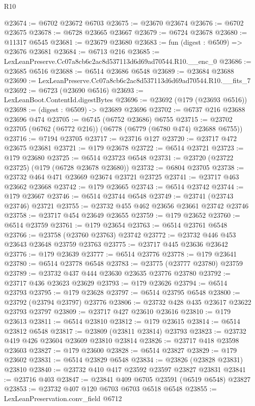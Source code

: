 \begin{lexlean}{R10}
\begin{coremodule}
@23674 := @6702 @23672 @6703
@23675 := @23670 @23674
@23676 := @6702 @23675
@23678 := @6728 @23665 @23667
@23679 := @6724 @23678
@23680 := @11317 @6545
@23681 := @23679 @23680
@23683 := fun (digest : @6509) => @23676 @23681
@23684 := @6713 @216
@23685 := LexLeanPreserve.Cc07a8cb6c2ac8d537113d6d69ad70544.R10.__enc_0
@23686 := @23685 @6516
@23688 := @6514 @23686 @6548
@23689 := @23684 @23688
@23690 := LexLeanPreserve.Cc07a8cb6c2ac8d537113d6d69ad70544.R10.__fits_7
@23692 := @6723 (@23690 @6516)
@23693 := LexLeanBoot.ContentId.digestBytes
@23696 := @23692 (@179 (@23693 @6516))
@23698 := (digest : @6509) -> @23689 @23696
@23702 := @6737 @216 @23688 @23696 @474
@23705 := @6745 (@6752 @23686) @6755
@23715 := @23702 @23705 (@6762 (@6772 @216)) (@6778 (@6779 (@6780 @474) @23688 @6755))
@23716 := @7194 @23705
@23717 := @23716 @127
@23720 := @23717 @472 @23675 @23681
@23721 := @179 @23678
@23722 := @6514 @23721
@23723 := @179 @23680
@23725 := @6514 @23723 @6548
@23731 := @23720 (@23722 @23725) (@179 (@6728 @23678 @23680))
@23732 := @6804 @23705
@23738 := @23732 @464 @471 @23669 @23674 @23721 @23725
@23741 := @23717 @463 @23662 @23668
@23742 := @179 @23665
@23743 := @6514 @23742
@23744 := @179 @23667
@23746 := @6514 @23744 @6548
@23749 := @23741 (@23743 @23746) @23721
@23755 := @23732 @455 @462 @23656 @23661 @23742 @23746
@23758 := @23717 @454 @23649 @23655
@23759 := @179 @23652
@23760 := @6514 @23759
@23761 := @179 @23654
@23763 := @6514 @23761 @6548
@23766 := @23758 (@23760 @23763) @23742
@23772 := @23732 @446 @453 @23643 @23648 @23759 @23763
@23775 := @23717 @445 @23636 @23642
@23776 := @179 @23639
@23777 := @6514 @23776
@23778 := @179 @23641
@23780 := @6514 @23778 @6548
@23783 := @23775 (@23777 @23780) @23759
@23789 := @23732 @437 @444 @23630 @23635 @23776 @23780
@23792 := @23717 @436 @23623 @23629
@23793 := @179 @23626
@23794 := @6514 @23793
@23795 := @179 @23628
@23797 := @6514 @23795 @6548
@23800 := @23792 (@23794 @23797) @23776
@23806 := @23732 @428 @435 @23617 @23622 @23793 @23797
@23809 := @23717 @427 @23610 @23616
@23810 := @179 @23613
@23811 := @6514 @23810
@23812 := @179 @23615
@23814 := @6514 @23812 @6548
@23817 := @23809 (@23811 @23814) @23793
@23823 := @23732 @419 @426 @23604 @23609 @23810 @23814
@23826 := @23717 @418 @23598 @23603
@23827 := @179 @23600
@23828 := @6514 @23827
@23829 := @179 @23602
@23831 := @6514 @23829 @6548
@23834 := @23826 (@23828 @23831) @23810
@23840 := @23732 @410 @417 @23592 @23597 @23827 @23831
@23841 := @23716 @403
@23847 := @23841 @409 @6705 @23591 (@6519 @6548) @23827
@23853 := @23732 @407 @120 @6703 @6703 @6518 @6548
@23855 := LexLeanPreservation.conv_field @6712

\end{coremodule}
\end{lexlean}
